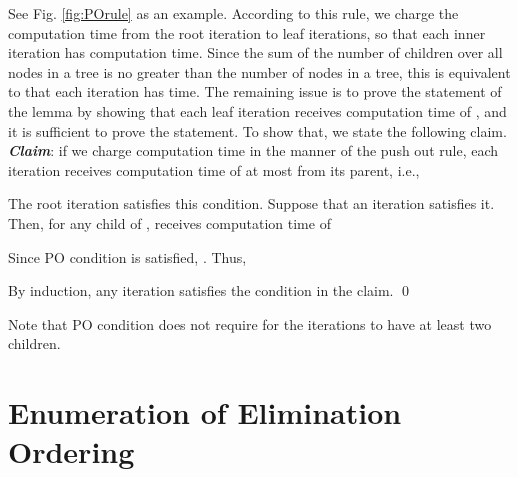 \documentclass{llncs}
\begin{document}
\vspace{-1mm}

\vspace{-3mm}

\noindent
See Fig. \ref{fig:POrule} as an example.
According to this rule, we charge the computation time from the root
 iteration to leaf iterations, so that each inner iteration has 
  computation time.
Since the sum of the number of children over all nodes in a tree is
 no greater than the number of nodes in a tree,
  this is equivalent to that each iteration has  time.
The remaining issue is to prove the statement of the lemma by showing
 that each leaf iteration receives computation time of , 
 and it is sufficient to prove the statement.
To show that, we state the following claim.\\
 
\vspace{-2mm}
\noindent 
{\bf \em Claim}: if we charge computation time in the manner of the push
 out rule, each iteration  receives computation time of at most
  from its parent, i.e., \\
\vspace{-2mm}

\noindent
The root iteration satisfies this condition.
Suppose that an iteration  satisfies it.
Then, for any child  of ,  receives computation time of 

\vspace{-4mm}

\vspace{-3mm}

\noindent
Since PO condition is satisfied, 
 .
Thus, 

\vspace{-1mm}

\vspace{-2mm}

\noindent
By induction, any iteration satisfies the condition in the claim.
\qed

Note that PO condition does not require for the iterations to have
 at least two children.


\vspace{-2mm}
\section{Enumeration of Elimination Ordering}\label{sec:elim}
\vspace{-2mm}
\end{document}
